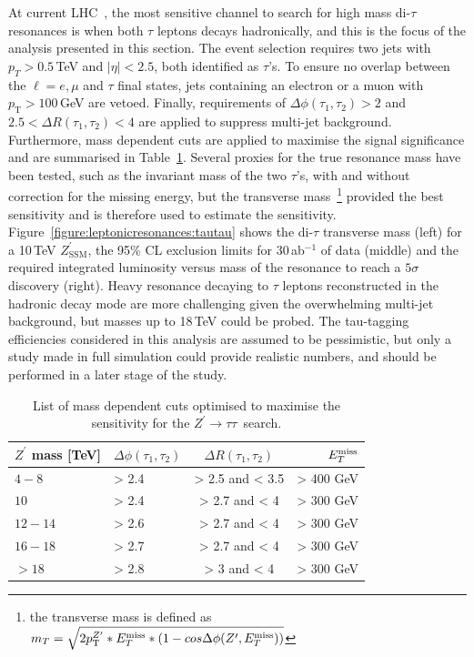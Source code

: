 \documentclass[a4paper,11pt]{article}
\newcommand{\Zp}{\ensuremath{Z^{\prime}}}
\newcommand{\ZpSSM}{\ensuremath{Z^{\prime}_{\mathrm{SSM}}}}
\newcommand*{\Zptata}{\ensuremath{Z^{\prime}\rightarrow \tau\tau}}
\newcommand{\pt}{\ensuremath{p_{\text{T}}}}
\newcommand{\ptZp}{\ensuremath{p_{\text{T}}^{\ensuremath{Z^{\prime}}}}}
\newcommand*{\met}{\ensuremath{E_{T}^{\rm{miss}}}}
\begin{document}
At current LHC~\cite{Khachatryan:2016qkc}, the most sensitive channel to search for high mass di-$\tau$ resonances is when both $\tau$ leptons decays hadronically, and this is the focus of the analysis presented in this section. The event selection requires two jets with $p_{T} > 0.5$\,TeV and $|\eta|<2.5$, both identified as $\tau$'s. To ensure no overlap between the $\ell=e,\mu$ and $\tau$ final states, jets containing an electron or a muon with $\pt > 100$\,GeV are vetoed. Finally, requirements of $\Delta \phi(\tau_1, \tau_2)> 2$ and $2.5<\Delta R(\tau_1, \tau_2)<4$ are applied to suppress multi-jet background. Furthermore, mass dependent cuts are applied to maximise the signal significance and are summarised in Table~\ref{tab:leptonicresonances:tautau}. Several proxies for the true resonance mass have been tested, such as the invariant mass of the two $\tau$'s, with and without correction for the missing energy, but the transverse mass~\footnote{the transverse mass is defined as $m_{T}  =  \sqrt{2\ptZp*\met*(1-cos\Delta\phi(\Zp,\met))} $} provided the best sensitivity and is therefore used to estimate the sensitivity.
Figure~\ref{figure:leptonicresonances:tautau} shows the di-$\tau$ transverse mass (left) for a 10\,TeV \ZpSSM, the 95\% CL exclusion limits for 30\,ab$^{-1}$ of data (middle) and the required integrated luminosity versus mass of the resonance to reach a $5\sigma$ discovery (right). Heavy resonance decaying to $\tau$ leptons reconstructed in the hadronic decay mode are more challenging given the overwhelming multi-jet background, but masses up to 18\,TeV could be probed. The tau-tagging efficiencies considered in this analysis are assumed to be pessimistic, but only a study made in full simulation could provide realistic numbers, and should be performed in a later stage of the study.

\begin{table}[htb!]
   \centering
\begin{tabular}{|l|l|c|r|}
  \hline
   $\Zp$ mass [TeV] &  $\Delta \phi(\tau_1, \tau_2)$&  $\Delta R(\tau_1, \tau_2)$ & $\met$\\
  \hline
  $4-8$ & > 2.4 & > 2.5 and < 3.5 & > 400 GeV\\
  $10$ & > 2.4 & > 2.7 and < 4 & > 300 GeV\\
  $12-14$ & > 2.6 & > 2.7 and < 4 & > 300 GeV\\
  $16-18$ & > 2.7 & > 2.7 and < 4 & > 300 GeV\\
  $>18$ & > 2.8 & > 3 and < 4 & > 300 GeV\\
  \hline
  \end{tabular}
  \caption{List of mass dependent cuts optimised to maximise the sensitivity for the \Zptata\ search.}
  \label{tab:leptonicresonances:tautau}
\end{table}
\end{document}

